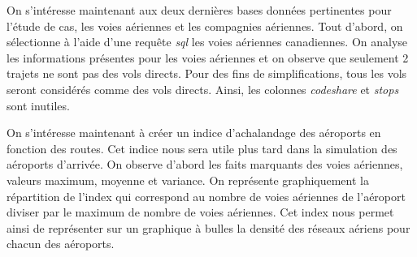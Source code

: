 On s'intéresse maintenant aux deux dernières bases données pertinentes pour l'étude de cas, les voies aériennes et les compagnies aériennes. Tout d'abord, on sélectionne à l'aide d'une requête \textit{sql} les voies aériennes canadiennes. On analyse les informations présentes pour les voies aériennes et on observe que seulement 2 trajets ne sont pas des vols directs. Pour des fins de simplifications, tous les vols seront considérés comme des vols directs. Ainsi, les colonnes \textit{codeshare} et \textit{stops} sont inutiles.

On s'intéresse maintenant à créer un indice d'achalandage des aéroports en fonction des routes. Cet indice nous sera utile plus tard dans la simulation des aéroports d'arrivée. On observe d'abord les faits marquants des voies aériennes, valeurs maximum, moyenne et variance. On représente graphiquement la répartition de l'index qui correspond au nombre de voies aériennes de l'aéroport diviser par le maximum de nombre de voies aériennes. Cet index nous permet ainsi de représenter sur un graphique à bulles  la densité des réseaux aériens pour chacun des aéroports.